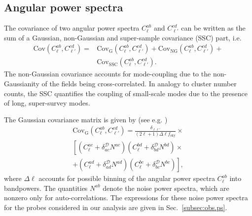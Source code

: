 \documentclass[%
 reprint,
nofootinbib,
 amsmath,amssymb,
 aps,
]{revtex4-1}
\begin{document}
\subsection{Angular power spectra}

The covariance of two angular power spectra $C^{ab}_{\ell}$ and $C^{cd}_{\ell'}$ can be written as the sum of a Gaussian, non-Gaussian and super-sample covariance (SSC) part, i.e.
\begin{equation}
\begin{aligned}
\mathrm{Cov}(C^{ab}_{\ell}, C^{cd}_{\ell'}) = &\mathrm{Cov}_{\mathrm{G}}(C^{ab}_{\ell}, C^{cd}_{\ell'}) + \mathrm{Cov}_{\mathrm{NG}}(C^{ab}_{\ell}, C^{cd}_{\ell'}) +\\ &\mathrm{Cov}_{\mathrm{SSC}}(C^{ab}_{\ell}, C^{cd}_{\ell'}). 
\end{aligned}
\end{equation}
The non-Gaussian covariance accounts for mode-coupling due to the non-Gaussianity of the fields being cross-correlated. In analogy to cluster number counts, the SSC quantifies the coupling of small-scale modes due to the presence of long, super-survey modes. 

The Gaussian covariance matrix is given by (see e.g. \cite{Hu:2004, Krause:2017})
\begin{equation}
\begin{aligned}
\mathrm{Cov}_{\mathrm{G}}(C_{\ell}^{ab}, C_{\ell'}^{cd}) = \frac{\delta_{\ell \ell'}}{(2\ell+1)\Delta \ell f_{\mathrm{sky}}} \times \\ 
\left [(C_{\ell}^{ac} + \delta^{\mathcal{D}}_{ac}N^{ac})(C_{\ell}^{bd} + \delta^{\mathcal{D}}_{bd}N^{bd}) \times \right. \\ 
+ \left. (C_{\ell}^{ad} + \delta^{\mathcal{D}}_{ad}N^{ad})(C_{\ell}^{bc} + \delta^{\mathcal{D}}_{bc}N^{bc})\right ],
\label{eq:theorycovmat}
\end{aligned}
\end{equation} 
where $\Delta \ell$ accounts for possible binning of the angular power spectra $C_{\ell}^{ab}$ into bandpowers. The quantities $N^{ab}$ denote the noise power spectra, which are nonzero only for auto-correlations. The expressions for these noise power spectra for the probes considered in our analysis are given in Sec.~\ref{subsec:obs.ps}.
\end{document}
